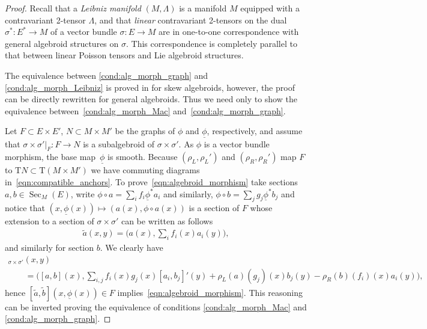 \documentclass[10pt,a4paper]{amsart}
\newcommand{\und}{\underline}
\newcommand{\Sec}{\operatorname{Sec}}
\newcommand{\ra}{\rightarrow}
\newcommand{\rhoL}{\rho_L} %
\newcommand{\rhoR}{\rho_R}
\newcommand{\T}{\mathrm{T}} %
\numberwithin{equation}{section}
\theoremstyle{definition}
\begin{document}
\begin{proof}Recall \cite{JG_PU_Algebroids_1999} that a \emph{Leibniz manifold} $(M, \Lambda)$ is a manifold $M$ equipped with a contravariant 2-tensor $\Lambda$, and that \emph{linear} contravariant 2-tensors on the dual $\sigma^\ast\colon E^\ast\ra M$ of a vector bundle $\sigma\colon E \ra M$ are in one-to-one correspondence with general algebroid structures on $\sigma$. This correspondence is completely parallel to that between linear Poisson tensors and Lie algebroid structures.

The equivalence between \eqref{cond:alg_morph_graph} and \eqref{cond:alg_morph_Leibniz} is proved in \cite[Theorem~5.1]{JG_mod_class_skew_alg_rel_2012} for skew algebroids, however, the proof can be directly rewritten for general algebroids. Thus we need only to show the equivalence between~\eqref{cond:alg_morph_Mac} and~\eqref{cond:alg_morph_graph}.

Let $F\subset E\times E'$, $N\subset M\times M'$ be the graphs of $\phi$ and $\und{\phi}$, respectively, and assume that $\sigma\times \sigma'|_F\colon F\ra N$ is a subalgebroid of $\sigma\times \sigma'$. As $\phi$ is a vector bundle morphism, the base map~$\und{\phi}$ is smooth. Because $(\rhoL, \rhoL')$ and $(\rhoR, \rhoR')$ map $F$ to $\T N \subset \T(M\times M')$ we have commuting diagrams in~\eqref{eqn:compatible_anchors}. To prove~\eqref{eqn:algebroid_morphism} take sections $a,b\in\Sec_M(E)$, write $\phi\circ a = \sum_i f_i \und{\phi}^\ast a_i$ and similarly, $\phi\circ b = \sum_j g_j \und{\phi}^\ast b_j$
and notice that $(x, \und{\phi}(x))\mapsto (a(x), \phi \circ a(x))$ is a section of $F$ whose extension to a section of $\sigma\times \sigma'$ can be written as follows
\begin{gather*}
\tilde{a}(x, y) = \bigg(a(x), \sum_i f_i(x) a_i(y)\bigg),
\end{gather*}
and similarly for section $b$. We clearly have
\begin{gather*}
[\tilde{a}, \tilde{b}]_{\sigma\times \sigma'}(x, y) \\
\qquad{} = \bigg([a, b](x), \sum_{i,j} f_i(x) g_j(x) [a_i, b_j]'(y) + \rhoL(a)(g_j)(x)b_j(y) - \rhoR(b)(f_i)(x) a_i(y) \bigg),
\end{gather*}
hence $[\tilde{a}, \tilde{b}](x, \und{\phi}(x)) \in F$ implies~\eqref{eqn:algebroid_morphism}. This reasoning can be inverted proving the equivalence of conditions \eqref{cond:alg_morph_Mac} and \eqref{cond:alg_morph_graph}.
\end{proof}
\end{document}
